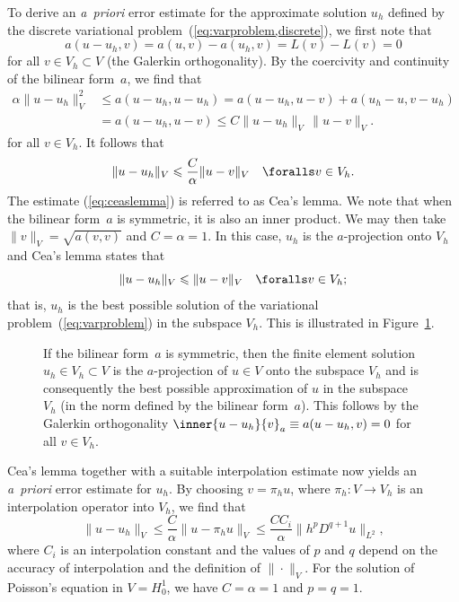 To derive an \emph{a~priori} error estimate for the approximate
solution $u_h$ defined by the discrete variational
problem~(\ref{eq:varproblem,discrete}), we first note that
\begin{equation}
  a(u - u_h, v) = a(u, v) - a(u_h, v) = L(v) - L(v) = 0
\end{equation}
for all $v \in V_h \subset V$ (the Galerkin orthogonality). By the
coercivity and continuity of the bilinear form~$a$, we find that
\begin{equation}
  \begin{split}
    \alpha \|u - u_h\|_V^2
    &\leqslant a(u - u_h, u - u_h)
    = a(u - u_h, u - v) + a(u_h - u, v - u_h)
    \\
    &= a(u - u_h, u - v) \leqslant C \|u - u_h\|_V \, \|u - v\|_V.
  \end{split}
\end{equation}
for all $v \in V_h$. It follows that
\begin{equation} \label{eq:ceaslemma}
  \|u - u_h\|_V
  \leqslant \frac{C}{\alpha} \|u - v\|_V \quad \foralls v \in V_h.
\end{equation}
%
The estimate (\ref{eq:ceaslemma}) is referred to as Cea's lemma. We
note that when the bilinear form~$a$ is symmetric, it is also an inner
product. We may then take $\|v\|_V = \sqrt{a(v, v)}$ and $C = \alpha =
1$. In this case, $u_h$ is the $a$-projection onto $V_h$ and Cea's
lemma states that
\begin{equation}
  \|u - u_h\|_V \leqslant \|u - v\|_V \quad \foralls v \in V_h;
\end{equation}
that is, $u_h$ is the best possible solution of the variational
problem~(\ref{eq:varproblem}) in the subspace $V_h$. This is
illustrated in Figure~\ref{fig:ceaslemma}.

\begin{figure}
  \center{}
  \caption{If the bilinear form~$a$ is symmetric, then the finite
    element solution~$u_h \in V_h \subset V$ is the $a$-projection
    of $u \in V$ onto the subspace $V_h$ and is consequently the
    best possible approximation of $u$ in the subspace $V_h$ (in the
    norm defined by the bilinear form~$a$). This follows by the Galerkin orthogonality
    $\inner{u - u_h}{v}_a \equiv a(u - u_h, v) = 0$ for all $v \in V_h$.}
  \label{fig:ceaslemma}
\end{figure}

Cea's lemma together with a suitable interpolation estimate now yields
an \emph{a~priori} error estimate for $u_h$. By choosing $v = \pi_h
u$, where $\pi_h : V \rightarrow V_h$ is an interpolation operator
into $V_h$, we find that
\begin{equation} \label{eq:apriori}
  \|u - u_h\|_V
  \leqslant \frac{C}{\alpha} \|u - \pi_h u\|_V
  \leqslant \frac{C C_i}{\alpha} \|h^p D^{q + 1} u\|_{L^2},
\end{equation}
where $C_i$ is an interpolation constant and the values of $p$ and $q$
depend on the accuracy of interpolation and the definition of
$\|\cdot\|_V$. For the solution of Poisson's equation in $V = H^1_0$,
we have $C = \alpha = 1$ and $p = q = 1$.


